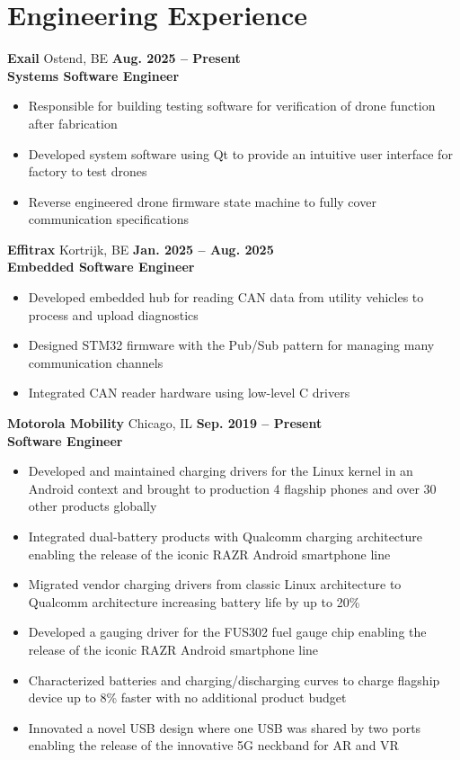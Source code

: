 \documentclass[letterpaper,10pt]{article}
\begin{document}
\section{Engineering Experience}
\textbf{Exail} Ostend, BE \hfill \textbf{Aug. 2025 -- Present}\\
\textbf{Systems Software Engineer}
\begin{itemize}
\item Responsible for building testing software for verification of drone function after fabrication
\item Developed system software using Qt to provide an intuitive user interface for factory to test drones
\item Reverse engineered drone firmware state machine to fully cover communication specifications
\end{itemize}
\textbf{Effitrax} Kortrijk, BE \hfill \textbf{Jan. 2025 -- Aug. 2025}\\
\textbf{Embedded Software Engineer}
\begin{itemize}
\item Developed embedded hub for reading CAN data from utility vehicles to process and upload diagnostics
\item Designed STM32 firmware with the Pub/Sub pattern for managing many communication channels
\item Integrated CAN reader hardware using low-level C drivers
\end{itemize}
\textbf{Motorola Mobility} Chicago, IL \hfill \textbf{Sep. 2019 -- Present}\\
\textbf{Software Engineer}
\begin{itemize}
\item Developed and maintained charging drivers for the Linux kernel in an Android context and brought to production 4 flagship phones and over 30 other products globally
\item Integrated dual-battery products with Qualcomm charging architecture enabling the release of the iconic RAZR Android smartphone line
\item Migrated vendor charging drivers from classic Linux architecture to Qualcomm architecture increasing battery life by up to 20\%
\item Developed a gauging driver for the FUS302 fuel gauge chip enabling the release of the iconic RAZR Android smartphone line
\item Characterized batteries and charging/discharging curves to charge flagship device up to 8\% faster with no additional product budget
\item Innovated a novel USB design where one USB was shared by two ports enabling the release of the innovative 5G neckband for AR and VR
\end{itemize}
\end{document}
